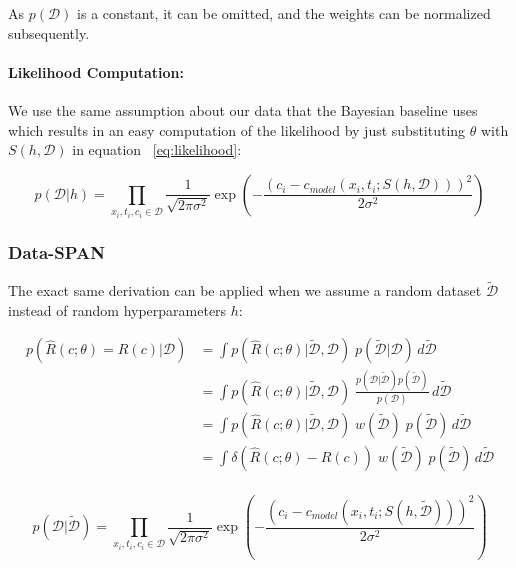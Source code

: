 As $p(\mathcal{D})$ is a constant, it can be omitted, and the weights can be normalized subsequently.


\paragraph{Likelihood Computation:}
We use the same assumption about our data that the Bayesian baseline uses which results in an easy computation of the likelihood by just substituting $\theta$ with $S(h, \mathcal{D})$ in equation ~\vref{eq:likelihood}:

\begin{equation*}
p(\mathcal{D} | h) = \prod_{x_i, t_i, c_i \in \mathcal{D}} \frac{1}{\sqrt{2\pi \sigma^2}} \exp \left( -\frac{(c_i - c_{model}(x_i, t_i; S(h, \mathcal{D})))^2}{2\sigma^2} \right)
\end{equation*}



\subsubsection{Data-SPAN}
The exact same derivation can be applied when we assume a random dataset $\tilde{\mathcal{D}}$ instead of random hyperparameters $h$:

\begin{align*}
    p(\hat{R}(c; \theta) = R(c)| \mathcal{D}) &= \int p(\hat{R}(c; \theta) | \tilde{\mathcal{D}}, \mathcal{D})\; p(\tilde{\mathcal{D}} | \mathcal{D}) \, d \tilde{\mathcal{D}} \\
                                              &= \int p(\hat{R}(c; \theta) | \tilde{\mathcal{D}}, \mathcal{D})\; \frac{p(\mathcal{D} | \tilde{\mathcal{D}}) p(\tilde{\mathcal{D}})}{p(\mathcal{D})} \, d \tilde{\mathcal{D}} \\
                                              &= \int p(\hat{R}(c; \theta) | \tilde{\mathcal{D}}, \mathcal{D})\; w(\tilde{\mathcal{D}})\; p(\tilde{\mathcal{D}}) \, d \tilde{\mathcal{D}} \\
                                              &= \int \delta(\hat{R}(c; \theta) - R(c))\; w(\tilde{\mathcal{D}})\; p(\tilde{\mathcal{D}}) \, d \tilde{\mathcal{D}} \\
\end{align*}

\begin{equation*}
    p(\mathcal{D} | \tilde{\mathcal{D}}) = \prod_{x_i, t_i, c_i \in \mathcal{D}} \frac{1}{\sqrt{2\pi \sigma^2}} \exp \left( -\frac{(c_i - c_{model}(x_i, t_i; S(h, \tilde{\mathcal{D}})))^2}{2\sigma^2} \right)
\end{equation*}

